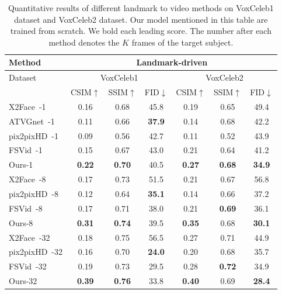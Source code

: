\documentclass[runningheads]{llncs}
\begin{document}
\begin{table}[h]
    \begin{center}
    \begin{tabular*}{0.75\linewidth}{  l | c c c | c c c}
      \toprule
      \toprule
 Method & \multicolumn{6}{c}{Landmark-driven}   \\ \hline

Dataset & \multicolumn{3}{c}{VoxCeleb1} & \multicolumn{3}{c}{VoxCeleb2}  \\
      \midrule
&{CSIM$\uparrow$}& {SSIM$\uparrow$}&{FID$\downarrow$} &{CSIM$\uparrow$}& {SSIM$\uparrow$}&{FID$\downarrow$}  \\
\hline  
{X2Face~\cite{wiles2018x2face}-1} &0.16 &0.68 &45.8 & 0.19  & 0.65 & 49.4 \\ \hline

 {ATVGnet~\cite{chen2019hierarchical}-1}&0.11 & 0.66 & \textbf{37.9} & 0.14 & 0.68 & 42.2  \\    \hline

 {pix2pixHD~\cite{wang2018high}-1} & { 0.09 } &{ 0.56} &{ 42.7} & { 0.11 } &{ 0.52} &{ 43.9} \\ \hline
 {FSVid~\cite{zakharov2019few}-1} & {0.15 } &{0.67  } &{ 43.0} & 0.21 & 0.64 & 41.2   \\ \hline
 {Ours-1} &\bf{0.22} & \bf{0.70} &{40.5} & \bf{0.27 } & \bf{ 0.68} &\bf{34.9 }  \\ \hline
 \bottomrule
{X2Face~\cite{wiles2018x2face}-8} &0.17 &0.73 &51.5 & 0.21  & 0.67 & 56.8 \\ \hline
 {pix2pixHD~\cite{wang2018high}-8} & { 0.12} &{ 0.64} &\bf{ 35.1} &{0.14}&{0.66}&{37.2} \\ \hline 
 {FSVid~\cite{zakharov2019few}-8} & {0.17} &{0.71} &{38.0} & {0.21}&\bf{0.69}&{36.1}  \\ \hline
 {Ours-8} &\bf{0.31} & \bf{0.74} &{39.5} & {\bf{0.35}} &{{0.68}} &\bf{30.1}  \\ \hline
  \bottomrule 
{X2Face~\cite{wiles2018x2face}-32} & 0.18&0.75 & 56.5 & 0.27  & 0.71  & 44.9 \\ \hline
 {pix2pixHD~\cite{wang2018high}-32} & {0.16} &{0.70} &{\textbf{24.0}} &{0.20}&{0.68}&{35.7}  \\ \hline
 {FSVid~\cite{zakharov2019few}-32} & {0.19} &{0.73 } &{29.5} & {0.28}&\bf{0.72}&{34.9}   \\ \hline
 {Ours-32} &\bf{0.39} & \bf{0.76} &{33.8} & \bf{0.40} &{0.69} &\bf{28.4} \\ \hline
      \bottomrule
  \end{tabular*}
  \end{center}
  \caption{Quantitative results of different landmark to video methods on VoxCeleb1 dataset and VoxCeleb2 dataset. Our model mentioned in this table are trained from scratch. We bold each leading score. The number after each method denotes the $K$ frames of the target subject.}
    \label{tab:lmark_tb}
\end{table}
\end{document}
